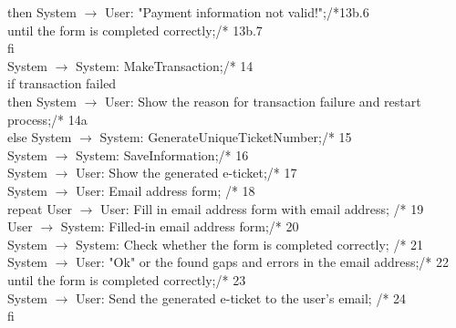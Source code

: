 \phantom{x}\hspace{21mm} then System $\rightarrow$ User: "Payment information not valid!";\hfill /*13b.6\\
\phantom{x}\hspace{7mm} until the form is completed correctly;\hfill /* 13b.7\\
fi\\
System $\rightarrow$ System: MakeTransaction;\hfill /* 14\\
if transaction failed\\
then System $\rightarrow$ User: Show the reason for transaction failure and restart process;\hfill /* 14a\\
else System $\rightarrow$ System: GenerateUniqueTicketNumber;\hfill /* 15\\
\phantom{x}\hspace{7mm} System $\rightarrow$ System: SaveInformation;\hfill /* 16\\
\phantom{x}\hspace{7mm} System $\rightarrow$ User: Show the generated e-ticket;\hfill /* 17\\
\phantom{x}\hspace{7mm} System $\rightarrow$ User: Email address form; \hfill /* 18\\
\phantom{x}\hspace{7mm} repeat User $\rightarrow$ User: Fill in email address form with email address; \hfill /* 19\\
\phantom{x}\hspace{14mm} User $\rightarrow$ System: Filled-in email address form;\hfill /* 20\\
\phantom{x}\hspace{14mm} System $\rightarrow$ System: Check whether the form is completed correctly; \hfill /* 21\\
\phantom{x}\hspace{14mm} System $\rightarrow$ User: "Ok" or the found gaps and errors in the email address;\hfill /* 22\\
\phantom{x}\hspace{7mm} until the form is completed correctly;\hfill /* 23\\
\phantom{x}\hspace{7mm} System $\rightarrow$ User: Send the generated e-ticket to the user's email; \hfill /* 24\\
fi

